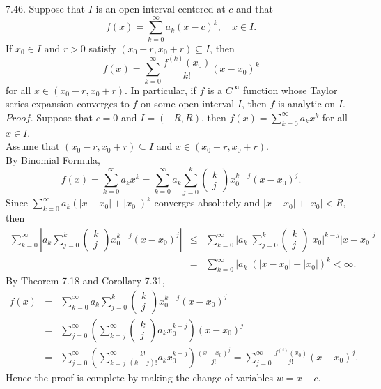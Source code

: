 \documentclass[12pt]{book}
\begin{document}
\begin{CJK}{UTF8}{bsmi}
7.46. Suppose that $I$ is an open interval centered at $c$ and that
\[
    f(x)
    = \sum_{k=0}^\infty a_k (x-c)^k,\quad x\in I.
\]
If $x_0\in I$ and $r>0$ satisfy $(x_0-r, x_0+r)\subseteq I$, then
\[
    f(x)
    = \sum_{k=0}^\infty \frac{f^{(k)}(x_0)}{k!} (x-x_0)^k
\]
for all $x\in(x_0-r, x_0+r)$. In particular, if $f$ is a $C^\infty$ function whose Taylor series expansion converges to $f$ on some open interval $I$, then $f$ is analytic on $I$. \\
$Proof$. Suppose that $c=0$ and $I=(-R, R)$, then $f(x) = \sum_{k=0}^\infty a_k x^k$ for all $x\in I$. \\
Assume that $(x_0-r, x_0+r)\subseteq I$ and $x\in(x_0-r, x_0+r)$. \\
By Binomial Formula,
\[
    f(x)
    = \sum_{k=0}^\infty a_k x^k
    = \sum_{k=0}^\infty a_k \sum_{j=0}^k \left( \begin{matrix}
        k \\ j
    \end{matrix}\right) x^{k-j}_0 (x-x_0)^j.
\]
Since $\sum_{k=0}^\infty a_k (|x-x_0|+|x_0|)^k$ converges absolutely and $|x-x_0|+|x_0|<R$, then
\begin{eqnarray*}
\sum_{k=0}^\infty \left| a_k \sum_{j=0}^k \left( \begin{matrix}
    k \\ j
\end{matrix}\right) x^{k-j}_0 (x-x_0)^j\right|
    &\le& \sum_{k=0}^\infty |a_k| \sum_{j=0}^k \left( \begin{matrix}
        k \\ j
    \end{matrix}\right) |x_0|^{k-j} |x-x_0|^j \\
    & = & \sum_{k=0}^\infty |a_k| (|x-x_0|+|x_0|)^k < \infty. 
\end{eqnarray*}
By Theorem 7.18 and Corollary 7.31,
\begin{eqnarray*}
f(x)
    & = & \sum_{k=0}^\infty a_k \sum_{j=0}^k \left( \begin{matrix}
        k \\ j
    \end{matrix}\right) x^{k-j}_0 (x-x_0)^j \\
    & = & \sum_{j=0}^\infty \left( \sum_{k=j}^\infty \left( \begin{matrix}
        k \\ j
    \end{matrix}\right) a_k x^{k-j}_0 \right) (x-x_0)^j \\
    & = & \sum_{j=0}^\infty \left( \sum_{k=j}^\infty \frac{k!}{(k-j)!}a_k x^{k-j}_0 \right) \frac{(x-x_0)^j}{j!}
    = \sum_{j=0}^\infty \frac{f^{(j)}(x_0)}{j!} (x-x_0)^j. 
\end{eqnarray*}
Hence the proof is complete by making the change of variables $w = x-c$. \\


\end{CJK}
\end{document}
